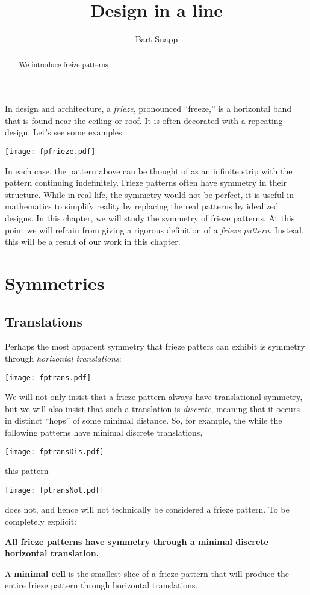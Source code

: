 \documentclass{ximera}
\title{Design in a line}
\author{Bart Snapp}
\begin{document}
\begin{abstract}
  We introduce freize patterns.
\end{abstract}
\maketitle

In design and architecture, a \textit{frieze},
pronounced ``freeze,'' is a horizontal band that is found near the
ceiling or roof. It is often decorated with a repeating design. Let's
see some examples:
\begin{center}
\texttt{[image: fpfrieze.pdf]}
\end{center}
In each case, the pattern above can be thought of as an infinite strip
with the pattern continuing indefinitely.  Frieze patterns often have
symmetry in their structure. While in real-life, the symmetry would
not be perfect, it is useful in mathematics to simplify reality by
replacing the real patterns by idealized designs.  In this chapter, we
will study the symmetry of frieze patterns. At this point we will
refrain from giving a rigorous definition of a \textit{frieze
  pattern}. Instead, this will be a result of our work in this
chapter.

\section{Symmetries}

\subsection*{Translations}

Perhaps the most apparent symmetry that frieze patters can exhibit is
symmetry through \textit{horizontal translations}:
\begin{center}
\texttt{[image: fptrans.pdf]}
\end{center}
We will not only insist that a frieze pattern always have
translational symmetry, but we will also insist that such a
translation is \textit{discrete}, meaning that it occurs in distinct
``hops'' of some minimal distance. So, for example, the while the
following patterns have minimal discrete translations, 
\begin{center}
\texttt{[image: fptransDis.pdf]}
\end{center}
this pattern
\begin{center}
\texttt{[image: fptransNot.pdf]}
\end{center}
does not, and hence will not technically be considered a frieze
pattern. To be completely explicit: 
\begin{center}
\textbf{All frieze patterns have symmetry through a minimal discrete
  horizontal translation.}
\end{center}
\begin{definition}
A \textbf{minimal cell} is the smallest slice of a frieze
pattern that will produce the entire frieze pattern through horizontal
translations.
\end{definition}
\end{document}
